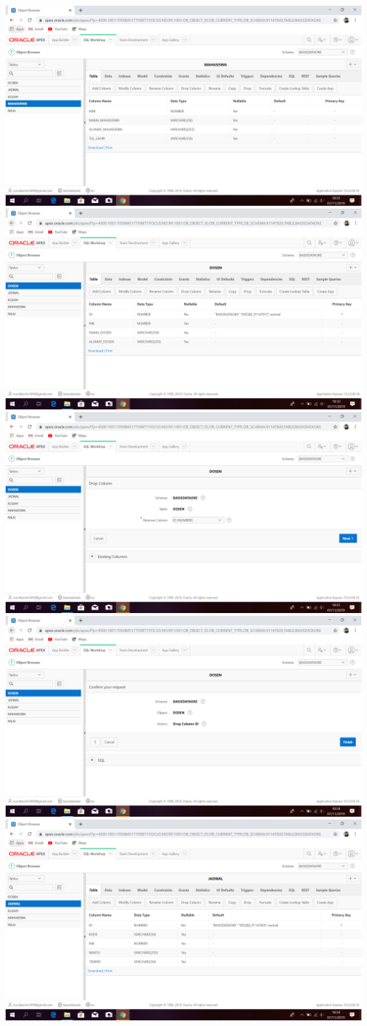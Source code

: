 \documentclass{article}
\begin{document}
\begin{enumerate}
\begin{enumerate}
\begin{center}
    \includegraphics[width=.8\textwidth]{figure/20.PNG}
    \includegraphics[width=.8\textwidth]{figure/21.PNG}
    \includegraphics[width=.8\textwidth]{figure/22.PNG}
    \includegraphics[width=.8\textwidth]{figure/23.PNG}
    \includegraphics[width=.8\textwidth]{figure/24.PNG}

\end{center}
\end{enumerate}
\end{enumerate}
\end{document}
